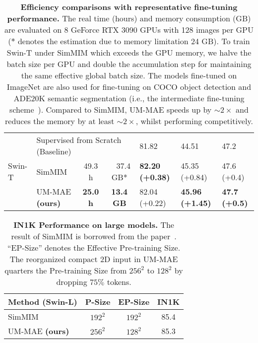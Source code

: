 \documentclass{article}
\begin{document}
\begin{table}
{\begin{tabular}{l|l||c|c||l|l|l}
        \multirow{3}{*}{Swin-T~\cite{liu2021swin}} & \multicolumn{3}{l||}{Supervised from Scratch (Baseline)}  & 81.82 & 44.51 & 47.2 \\ \cline{2-7}
        & SimMIM~\cite{xie2021simmim} & 49.3 h  & \ \ 37.4 GB* & \textbf{82.20 {\scriptsize (+0.38)}}  & 45.35 {\scriptsize (+0.84)} & 47.6 {\scriptsize (+0.4)}\\
        & UM-MAE \textbf{(ours)} & \textbf{25.0 h}  & \textbf{13.4 GB} & 82.04 {\scriptsize (+0.22)} & \textbf{45.96 {\scriptsize (+1.45)}} & \textbf{47.7 {\scriptsize (+0.5)}} \\ \hline
        \end{tabular}
    }
	\vspace{2pt}
    \caption{\textbf{Efficiency comparisons with representative fine-tuning performance.} The real time (hours) and memory consumption (GB) are evaluated on 8 GeForce RTX 3090 GPUs with 128 images per GPU ($*$ denotes the estimation due to memory limitation 24 GB). To train Swin-T under SimMIM which exceeds the GPU memory, we halve the batch size per GPU and double the accumulation step for maintaining the same effective global batch size. The models fine-tuned on ImageNet are also used for fine-tuning on COCO object detection and ADE20K semantic segmentation (i.e., the intermediate fine-tuning scheme~\cite{bao2021beit,liu2021swinv2}). Compared to SimMIM, UM-MAE speeds up by $\sim 2\times$ and reduces the memory by at least $\sim 2\times$, whilst performing competitively.
    }
    \label{table_efficiency}
	\vspace{-20pt}
\end{table}



\begin{wraptable}{r}{0.42\textwidth}
\begin{minipage}[ht]{0.4\textwidth}
\vspace{-10pt}
    \renewcommand\arraystretch{1.2}
    \setlength{\tabcolsep}{6.pt}
    \footnotesize
    \centering
    \resizebox{\textwidth}{!}
    {
        \begin{tabular}{l|c|c|c}
        \hline
Method (Swin-L) & P-Size & EP-Size & IN1K \\\hline
        SimMIM~\cite{xie2021simmim}& $192^2$ & $192^2$ & 85.4 \\
        UM-MAE \textbf{(ours)}     & $256^2$ & $128^2$ & 85.3 \\
        \hline
        \end{tabular}
    }
	\vspace{-6pt}
	\caption{\textbf{IN1K Performance on large models.} The result of SimMIM is borrowed from the paper~\cite{xie2021simmim}. ``EP-Size'' denotes the Effective Pre-training Size. The reorganized compact 2D input in UM-MAE quarters the Pre-training Size from $256^2$ to $128^2$ by dropping $75\%$ tokens.
	}
\label{table_large_model}
\vspace{-20pt}
\end{minipage} \vspace{12pt}
\end{wraptable}
\end{document}
